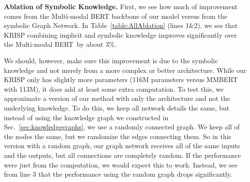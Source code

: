 \documentclass[final]{cvpr}
\providecommand{\ModelName}{KRISP\xspace}
\providecommand{\MMBERTBase}{Multi-modal BERT\xspace}
\providecommand{\MMBERTAbr}{MMBERT\xspace}
\providecommand{\myparagraph}[1]{\noindent\textbf{#1.}}
\begin{document}
\myparagraph{Ablation of Symbolic Knowledge}
First, we see how much of improvement comes from the \MMBERTBase backbone of our model versus from the symbolic Graph Network. In Table~\ref{table:AllAblation} (lines 1\&2),
we see that \ModelName combining implicit and symbolic knowledge improves significantly over the \MMBERTBase~by about 3\%. 

We should, however, make sure this improvement is due to the symbolic knowledge and not merely from a more complex or better architecture. While our \ModelName only has slightly more parameters (116M parameters versus \MMBERTAbr with 113M), it does add at least some extra computation. To test this, we approximate a version of our method with only  the architecture and not the underlying knowledge. To do this, we keep all network details the same, but instead of using the knowledge graph we constructed in Sec.~\ref{sec:knowledgegraphs}, we use a randomly connected graph. We keep all of the nodes the same, but we randomize the edges connecting them. So in this version with a random graph, our graph network receives all of the same inputs and the outputs, but all connections are completely random. If the performance were just from the computation, we would expect this to work. 
Instead, we see from line 3 that the performance using the random graph drops significantly.
\end{document}
